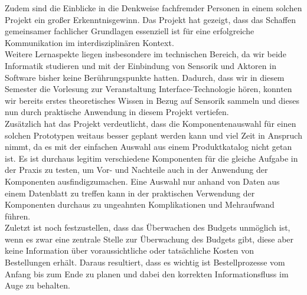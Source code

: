    Zudem sind die Einblicke in die Denkweise fachfremder Personen in einem solchen Projekt ein großer Erkenntnisgewinn. Das Projekt hat gezeigt, dass das Schaffen gemeinsamer fachlicher Grundlagen essenziell ist für eine erfolgreiche Kommunikation im interdisziplinären Kontext.\\

    Weitere Lernaspekte liegen insbesondere im technischen Bereich, da wir beide Informatik studieren und mit der Einbindung von Sensorik und Aktoren in Software bisher keine Berührungspunkte hatten. Dadurch, dass wir in diesem Semester die Vorlesung zur Veranstaltung Interface-Technologie hören, konnten wir bereits erstes theoretisches Wissen in Bezug auf Sensorik sammeln und dieses nun durch praktische Anwendung in diesem Projekt vertiefen.\\

    Zusätzlich hat das Projekt verdeutlicht, dass die Komponentenauswahl für einen solchen Prototypen weitaus besser geplant werden kann und viel Zeit in Anspruch nimmt, da es mit der einfachen Auswahl aus einem Produktkatalog nicht getan ist. Es ist durchaus legitim verschiedene Komponenten für die gleiche Aufgabe in der Praxis zu testen, um Vor- und Nachteile auch in der Anwendung der Komponenten ausfindigzumachen. Eine Auswahl nur anhand von Daten aus einem Datenblatt zu treffen kann in der praktischen Verwendung der Komponenten durchaus zu ungeahnten Komplikationen und Mehraufwand führen.\\

    Zuletzt ist noch festzustellen, dass das Überwachen des Budgets unmöglich ist, wenn es zwar eine zentrale Stelle zur Überwachung des Budgets gibt, diese aber keine Information über voraussichtliche oder tatsächliche Kosten von Bestellungen erhält. Daraus resultiert, dass es wichtig ist Bestellprozesse vom Anfang bis zum Ende zu planen und dabei den korrekten Informationsfluss im Auge zu behalten.